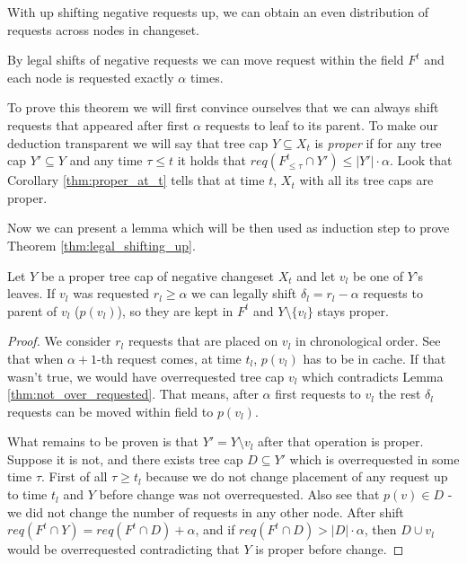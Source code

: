 With up shifting negative requests up, we can obtain an even distribution of 
requests across nodes in changeset.
\begin{theorem}
By legal shifts of negative requests we can move request within the field $F^t$ 
and each node is requested exactly $\alpha$ times.
\label{thm:legal_shifting_up}
\end{theorem}
To prove this theorem we will first convince ourselves that we can always 
shift requests that appeared after first $\alpha$ requests to leaf to its 
parent. To make our deduction transparent we will say that tree cap $Y 
\subseteq X_t$ is \textit{proper} if for any tree cap $Y' \subseteq Y$ and any 
time $\tau \leq t$ it holds that $req(F^t_{\leq \tau} \cap Y') \leq |Y'| \cdot 
\alpha$. Look that Corollary \ref{thm:proper_at_t} tells that at time $t$, 
$X_t$ with all its tree caps are proper.

Now we can present a lemma which will be then used as induction step to prove 
Theorem \ref{thm:legal_shifting_up}.
\begin{lemma}
 Let $Y$ be a proper tree cap of negative changeset $X_t$ and let $v_l$ be one 
of $Y$'s leaves. If $v_l$ was requested $r_l \geq \alpha$ we can legally shift  
$\delta_l = r_l - \alpha$ requests to parent of $v_l$ ($p(v_l)$), so they are 
kept in $F^t$ and $Y \setminus \{v_l\}$ stays proper. 
\end{lemma}
\begin{proof}
We consider $r_l$ requests that are placed on $v_l$ in chronological order. See 
that when $\alpha + 1$-th request comes, at time $t_l$, $p(v_l)$ has to be in 
cache. If that wasn't true, we would have overrequested tree cap ${v_l}$ which 
contradicts Lemma \ref{thm:not_over_requested}. That means, after $\alpha$ first 
requests to $v_l$ the rest $\delta_l$ requests can be moved within field to 
$p(v_l)$.

What remains to be proven is that $Y' = Y \setminus {v_l}$ after that operation 
is proper. Suppose it is not, and there exists tree cap $D \subseteq Y'$ which 
is overrequested in some time $\tau$. First of all $\tau \geq t_l$ because we 
do not change placement of any request up to time $t_l$ and $Y$ before change 
was not overrequested. Also see that $p(v) \in D$ - we did not change the 
number of requests in any other node. After shift $req(F^t \cap Y) = req(F^t 
\cap D) + \alpha$, and if $req(F^t \cap D) > |D| \cdot \alpha$, then $D \cup 
v_l$ would be overrequested contradicting that $Y$ is proper before change.
\end{proof}

